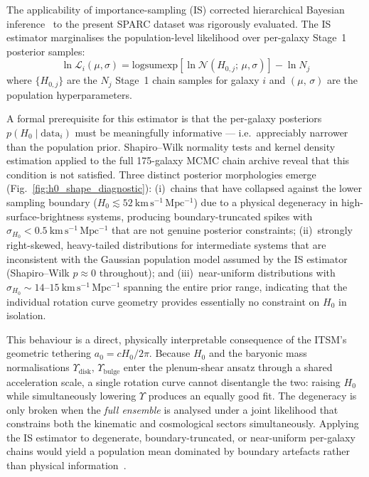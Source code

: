 \documentclass[aps,prd,10pt,onecolumn,superscriptaddress,nofootinbib]{revtex4-2}
\begin{document}
The applicability of importance-sampling (IS) corrected hierarchical Bayesian inference~\cite{mandel2019} to the present SPARC dataset was rigorously evaluated. The IS estimator marginalises the population-level likelihood over per-galaxy Stage~1 posterior samples:
\begin{equation}
\ln \mathcal{L}_i(\mu, \sigma) = \mathrm{logsumexp}\!\left[\ln \mathcal{N}(H_{0,j};\,\mu,\sigma)\right] - \ln N_j
\end{equation}
where $\{H_{0,j}\}$ are the $N_j$ Stage~1 chain samples for galaxy $i$ and $(\mu,\,\sigma)$ are the population hyperparameters.

A formal prerequisite for this estimator is that the per-galaxy posteriors $p(H_0 \mid \mathrm{data}_i)$ must be meaningfully informative --- i.e.\ appreciably narrower than the population prior. Shapiro--Wilk normality tests and kernel density estimation applied to the full 175-galaxy MCMC chain archive reveal that this condition is not satisfied. Three distinct posterior morphologies emerge (Fig.~\ref{fig:h0_shape_diagnostic}): (i)~chains that have collapsed against the lower sampling boundary ($H_0 \lesssim 52\ \mathrm{km\,s^{-1}\,Mpc^{-1}}$) due to a physical degeneracy in high-surface-brightness systems, producing boundary-truncated spikes with $\sigma_{H_0} < 0.5\ \mathrm{km\,s^{-1}\,Mpc^{-1}}$ that are not genuine posterior constraints; (ii)~strongly right-skewed, heavy-tailed distributions for intermediate systems that are inconsistent with the Gaussian population model assumed by the IS estimator (Shapiro--Wilk $p \approx 0$ throughout); and (iii)~near-uniform distributions with $\sigma_{H_0} \sim 14$--$15\ \mathrm{km\,s^{-1}\,Mpc^{-1}}$ spanning the entire prior range, indicating that the individual rotation curve geometry provides essentially no constraint on $H_0$ in isolation.

This behaviour is a direct, physically interpretable consequence of the ITSM's geometric tethering $a_0 = cH_0/2\pi$. Because $H_0$ and the baryonic mass normalisations $\Upsilon_{\mathrm{disk}},\,\Upsilon_{\mathrm{bulge}}$ enter the plenum-shear ansatz through a shared acceleration scale, a single rotation curve cannot disentangle the two: raising $H_0$ while simultaneously lowering $\Upsilon$ produces an equally good fit. The degeneracy is only broken when the \emph{full ensemble} is analysed under a joint likelihood that constrains both the kinematic and cosmological sectors simultaneously. Applying the IS estimator to degenerate, boundary-truncated, or near-uniform per-galaxy chains would yield a population mean dominated by boundary artefacts rather than physical information~\cite{thrane2019,hogg2010}.
\end{document}
